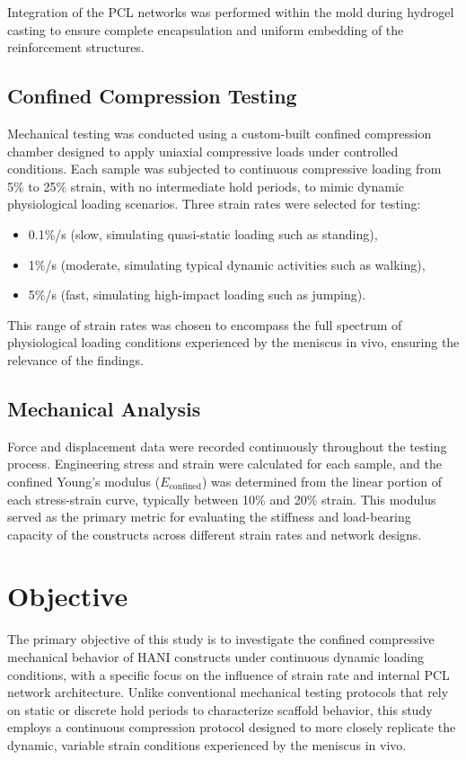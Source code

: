 Integration of the PCL networks was performed within the mold during hydrogel casting to ensure complete encapsulation and uniform embedding of the reinforcement structures.

\subsection{Confined Compression Testing}

Mechanical testing was conducted using a custom-built confined compression chamber designed to apply uniaxial compressive loads under controlled conditions. Each sample was subjected to continuous compressive loading from 5\% to 25\% strain, with no intermediate hold periods, to mimic dynamic physiological loading scenarios. Three strain rates were selected for testing:

\begin{itemize}
    \item 0.1\%/s (slow, simulating quasi-static loading such as standing),
    \item 1\%/s (moderate, simulating typical dynamic activities such as walking),
    \item 5\%/s (fast, simulating high-impact loading such as jumping).
\end{itemize}

This range of strain rates was chosen to encompass the full spectrum of physiological loading conditions experienced by the meniscus in vivo, ensuring the relevance of the findings.

\subsection{Mechanical Analysis}

Force and displacement data were recorded continuously throughout the testing process. Engineering stress and strain were calculated for each sample, and the confined Young’s modulus ($E_{\text{confined}}$) was determined from the linear portion of each stress-strain curve, typically between 10\% and 20\% strain. This modulus served as the primary metric for evaluating the stiffness and load-bearing capacity of the constructs across different strain rates and network designs.

\section{Objective}

The primary objective of this study is to investigate the confined compressive mechanical behavior of HANI constructs under continuous dynamic loading conditions, with a specific focus on the influence of strain rate and internal PCL network architecture. Unlike conventional mechanical testing protocols that rely on static or discrete hold periods to characterize scaffold behavior, this study employs a continuous compression protocol designed to more closely replicate the dynamic, variable strain conditions experienced by the meniscus in vivo.

